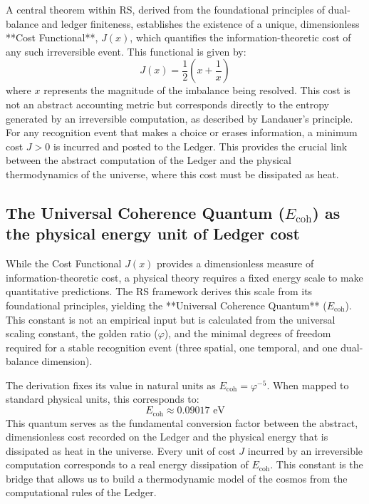 \documentclass[11pt,a4paper]{article}
\theoremstyle{definition}
\theoremstyle{remark}
\begin{document}
A central theorem within RS, derived from the foundational principles of dual-balance and ledger finiteness, establishes the existence of a unique, dimensionless **Cost Functional**, \(J(x)\), which quantifies the information-theoretic cost of any such irreversible event. This functional is given by:
\begin{equation}
    J(x) = \frac{1}{2}\left(x + \frac{1}{x}\right)
\end{equation}
where \(x\) represents the magnitude of the imbalance being resolved. This cost is not an abstract accounting metric but corresponds directly to the entropy generated by an irreversible computation, as described by Landauer's principle. For any recognition event that makes a choice or erases information, a minimum cost \(J > 0\) is incurred and posted to the Ledger. This provides the crucial link between the abstract computation of the Ledger and the physical thermodynamics of the universe, where this cost must be dissipated as heat.

\subsection{The Universal Coherence Quantum (\(E_{\text{coh}}\)) as the physical energy unit of Ledger cost}

While the Cost Functional \(J(x)\) provides a dimensionless measure of information-theoretic cost, a physical theory requires a fixed energy scale to make quantitative predictions. The RS framework derives this scale from its foundational principles, yielding the **Universal Coherence Quantum** (\(E_{\text{coh}}\)). This constant is not an empirical input but is calculated from the universal scaling constant, the golden ratio (\(\varphi\)), and the minimal degrees of freedom required for a stable recognition event (three spatial, one temporal, and one dual-balance dimension).

The derivation fixes its value in natural units as \(E_{\text{coh}} = \varphi^{-5}\). When mapped to standard physical units, this corresponds to:
\begin{equation}
    E_{\text{coh}} \approx 0.09017 \text{ eV}
\end{equation}
This quantum serves as the fundamental conversion factor between the abstract, dimensionless cost recorded on the Ledger and the physical energy that is dissipated as heat in the universe. Every unit of cost \(J\) incurred by an irreversible computation corresponds to a real energy dissipation of \(E_{\text{coh}}\). This constant is the bridge that allows us to build a thermodynamic model of the cosmos from the computational rules of the Ledger.
\end{document}
